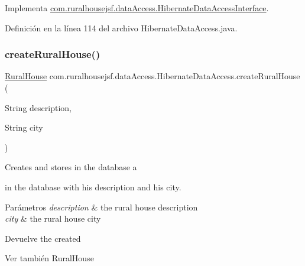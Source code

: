 Implementa \mbox{\hyperlink{interfacecom_1_1ruralhousejsf_1_1data_access_1_1_hibernate_data_access_interface_a31f9cb8a3c8f0b42dee19b03f052cd62}{com.\+ruralhousejsf.\+data\+Access.\+Hibernate\+Data\+Access\+Interface}}.



Definición en la línea 114 del archivo Hibernate\+Data\+Access.\+java.

\mbox{\label{classcom_1_1ruralhousejsf_1_1data_access_1_1_hibernate_data_access_a23eafc2c1f43052f2005a863d6592abc}} 
\subsubsection{\texorpdfstring{createRuralHouse()}{createRuralHouse()}}
{\footnotesize\ttfamily \mbox{\hyperlink{classcom_1_1ruralhousejsf_1_1domain_1_1_rural_house}{Rural\+House}} com.\+ruralhousejsf.\+data\+Access.\+Hibernate\+Data\+Access.\+create\+Rural\+House (\begin{DoxyParamCaption}\item[{String}]{description,  }\item[{String}]{city }\end{DoxyParamCaption})}

Creates and stores in the database a
\begin{DoxyCode}{0}
\end{DoxyCode}
 in the database with his description and his city.


\begin{DoxyParams}{Parámetros}
{\em description} & the rural house description \\
\hline
{\em city} & the rural house city\\
\hline
\end{DoxyParams}
\begin{DoxyReturn}{Devuelve}
the created
\begin{DoxyCode}{0}
\end{DoxyCode}

\end{DoxyReturn}
\begin{DoxySeeAlso}{Ver también}
Rural\+House 
\end{DoxySeeAlso}


